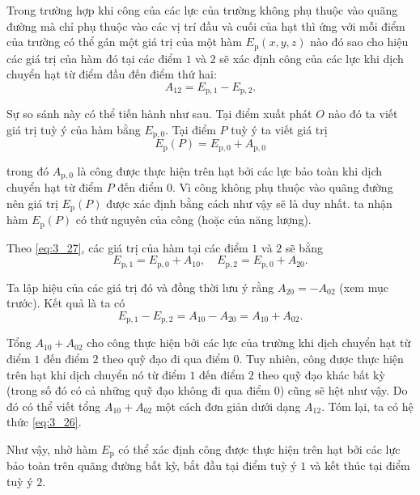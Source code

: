 Trong trường hợp khi công của các lực của trường không phụ thuộc vào quãng đường mà chỉ phụ thuộc vào các vị trí đầu và cuối của hạt thì ứng với mỗi điểm của trường có thể gán một giá trị của một hàm $E_{\text{p}}(x,y,z)$ nào đó sao cho hiệu các giá trị của hàm đó tại các điểm  $1$ và $2$ sẽ xác định công của các lực khi dịch chuyển hạt từ điểm đầu đến điểm thứ hai:
\begin{equation}\label{eq:3_26}
A_{12} = E_{\text{p},1} - E_{\text{p},2}.
\end{equation}

Sự so sánh này có thể tiến hành như sau. Tại điểm xuất phát $O$ nào đó ta viết giá trị tuỳ ý của hàm bằng  $E_{\text{p},0}$. Tại điểm $P$ tuỳ ý ta viết giá trị
\begin{equation}\label{eq:3_27}
E_{\text{p}}(P) = E_{\text{p},0} + A_{\text{p},0}
\end{equation}

\noindent
trong đó $A_{\text{p},0}$ là công được thực hiện trên hạt bởi các lực bảo toàn khi dịch chuyển hạt từ điểm $P$ đến điểm $0$. Vì công không phụ thuộc vào quãng đường nên giá trị $E_{\text{p}}(P)$ được xác định bằng cách như vậy sẽ là duy nhất. ta nhận hàm $E_{\text{p}}(P)$ có thứ nguyên của công (hoặc của năng lượng).

Theo \eqref{eq:3_27}, các giá trị của hàm tại các điểm $1$ và $2$ sẽ bằng 
\begin{equation*}
E_{\text{p},1} = E_{\text{p},0} + A_{10},\quad E_{\text{p},2} = E_{\text{p},0} + A_{20}.
\end{equation*}

\noindent
Ta lập hiệu của các giá trị đó và đồng thời lưu ý rằng $A_{20}=-A_{02}$ (xem mục trước). Kết quả là ta có
\begin{equation*}
E_{\text{p},1} - E_{\text{p},2} = A_{10} - A_{20} = A_{10} + A_{02}.
\end{equation*}

\noindent
Tổng $A_{10}+A_{02}$ cho công thực hiện bởi các lực của trường khi dịch chuyển hạt từ điểm $1$ đến điểm $2$ theo quỹ đạo đi qua điểm $0$. Tuy nhiên, công được thực hiện trên hạt khi dịch chuyển nó từ điểm $1$ đến điểm $2$ theo quỹ đạo khác bất kỳ (trong số đó có cả những quỹ đạo không đi qua điểm $0$) cũng sẽ  hệt như vậy. Do đó có thể viết tổng $A_{10}+A_{02}$ một cách đơn giản dưới dạng $A_{12}$. Tóm lại, ta có hệ thức \eqref{eq:3_26}.

Như vậy, nhờ hàm $E_{\text{p}}$ có thể xác định công được thực hiện trên hạt bởi các lực bảo toàn trên quãng đường bất kỳ, bắt đầu tại điểm tuỳ ý $1$ và kết thúc tại điểm tuỳ ý $2$.

